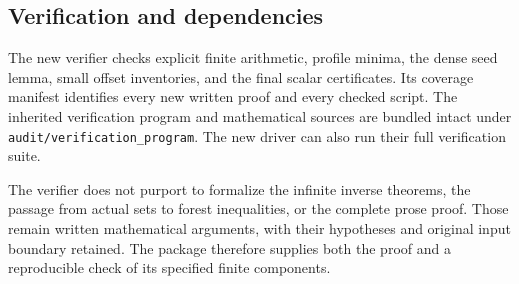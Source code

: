 \subsection{Verification and dependencies}
The new verifier checks explicit finite arithmetic, profile minima, the dense
seed lemma, small offset inventories, and the final scalar certificates. Its
coverage manifest identifies every new written proof and every checked script.
The inherited verification program and mathematical sources are bundled intact
under \texttt{audit/verification\_program}. The new driver can also run their
full verification suite.

The verifier does not purport to formalize the infinite inverse theorems, the
passage from actual sets to forest inequalities, or the complete prose proof.
Those remain written mathematical arguments, with their hypotheses and
original input boundary retained. The package therefore supplies both the
proof and a reproducible check of its specified finite components.

\clearpage
